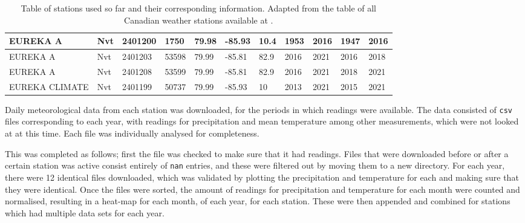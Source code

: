 \documentclass[12pt, oneside]{article}
\begin{document}
\begin{landscape}
\begin{table}
{\begin{tabular}{|l|l|l|l|l|l|l|l|l|l|l|}
EUREKA A         & Nvt               & 2401200             & 1750                & 79.98                          & -85.93                          & 10.4                   & 1953                    & 2016                   & 1947                    & 2016                   \\ \hline
EUREKA A         & Nvt               & 2401203             & 53598               & 79.99                          & -85.81                          & 82.9                   & 2016                    & 2021                   & 2016                    & 2018                   \\ \hline
EUREKA A         & Nvt               & 2401208             & 53599               & 79.99                          & -85.81                          & 82.9                   & 2016                    & 2021                   & 2018                    & 2021                   \\ \hline
EUREKA CLIMATE   & Nvt               & 2401199             & 50737               & 79.99                          & -85.93                          & 10                     & 2013                    & 2021                   & 2015                    & 2021                   \\ \hline




\end{tabular}}
\caption{Table of stations used so far and their corresponding information. Adapted from the table of all Canadian weather stations available at \cite{station_list}. }\label{table:1}


\end{table}
\end{landscape}




Daily meteorological data from each station was downloaded, for the periods in which readings were available. The data consisted of \verb |csv| files corresponding to each year, with readings for precipitation and mean temperature among other measurements, which were not looked at at this time. Each file was individually analysed for completeness.

This was completed as follows; first the file was checked to make sure that it had readings. Files that were downloaded before or after a certain station was active consist entirely of \verb |nan| entries, and these were filtered out by moving them to a new directory. For each year, there were 12 identical files downloaded, which was validated by plotting the precipitation and temperature for each and making sure that they were identical. Once the files were sorted, the amount of readings for precipitation and temperature for each month were counted and normalised, resulting in a heat-map for each month, of each year, for each station. These were then appended and combined for stations which had multiple data sets for each year. 
\end{document}

